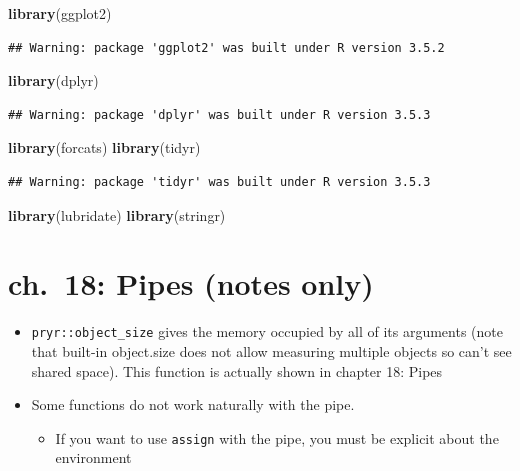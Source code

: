 \documentclass[]{book}
\newenvironment{Shaded}{\begin{snugshade}}{\end{snugshade}}
\newcommand{\KeywordTok}[1]{\textcolor[rgb]{0.13,0.29,0.53}{\textbf{#1}}}
\newcommand{\NormalTok}[1]{#1}
\providecommand{\tightlist}{%
  \setlength{\itemsep}{0pt}\setlength{\parskip}{0pt}}
\theoremstyle{definition}
\theoremstyle{definition}
\theoremstyle{definition}
\theoremstyle{remark}
\begin{document}
\begin{Shaded}
\begin{Highlighting}[]
\KeywordTok{library}\NormalTok{(ggplot2)}
\end{Highlighting}
\end{Shaded}

\begin{verbatim}
## Warning: package 'ggplot2' was built under R version 3.5.2
\end{verbatim}

\begin{Shaded}
\begin{Highlighting}[]
\KeywordTok{library}\NormalTok{(dplyr)}
\end{Highlighting}
\end{Shaded}

\begin{verbatim}
## Warning: package 'dplyr' was built under R version 3.5.3
\end{verbatim}

\begin{Shaded}
\begin{Highlighting}[]
\KeywordTok{library}\NormalTok{(forcats)}
\KeywordTok{library}\NormalTok{(tidyr)}
\end{Highlighting}
\end{Shaded}

\begin{verbatim}
## Warning: package 'tidyr' was built under R version 3.5.3
\end{verbatim}

\begin{Shaded}
\begin{Highlighting}[]
\KeywordTok{library}\NormalTok{(lubridate)}
\KeywordTok{library}\NormalTok{(stringr)}
\end{Highlighting}
\end{Shaded}

\hypertarget{ch.-18-pipes-notes-only}{%
\chapter{ch.~18: Pipes (notes only)}\label{ch.-18-pipes-notes-only}}

\begin{itemize}
\tightlist
\item
  \texttt{pryr::object\_size} gives the memory occupied by all of its
  arguments (note that built-in object.size does not allow measuring
  multiple objects so can't see shared space). This function is actually
  shown in chapter 18: Pipes
\item
  Some functions do not work naturally with the pipe.

  \begin{itemize}
  \tightlist
  \item
    If you want to use \texttt{assign} with the pipe, you must be
    explicit about the environment
  \end{itemize}
\end{itemize}
\end{document}

